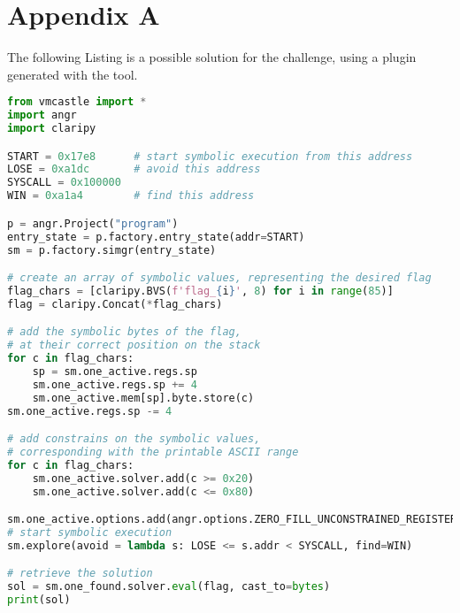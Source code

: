 \chapter*{Appendix A}

\label{anex}

The following Listing is a possible solution for the  challenge, using a plugin generated with the  tool.

\begin{lstlisting}[language=python]
from vmcastle import *
import angr
import claripy

START = 0x17e8      # start symbolic execution from this address
LOSE = 0xa1dc       # avoid this address
SYSCALL = 0x100000 
WIN = 0xa1a4        # find this address

p = angr.Project("program")
entry_state = p.factory.entry_state(addr=START)
sm = p.factory.simgr(entry_state)

# create an array of symbolic values, representing the desired flag
flag_chars = [claripy.BVS(f'flag_{i}', 8) for i in range(85)]
flag = claripy.Concat(*flag_chars)

# add the symbolic bytes of the flag, 
# at their correct position on the stack
for c in flag_chars:
    sp = sm.one_active.regs.sp
    sm.one_active.regs.sp += 4
    sm.one_active.mem[sp].byte.store(c)
sm.one_active.regs.sp -= 4

# add constrains on the symbolic values,
# corresponding with the printable ASCII range
for c in flag_chars:
    sm.one_active.solver.add(c >= 0x20)
    sm.one_active.solver.add(c <= 0x80)

sm.one_active.options.add(angr.options.ZERO_FILL_UNCONSTRAINED_REGISTERS)
# start symbolic execution
sm.explore(avoid = lambda s: LOSE <= s.addr < SYSCALL, find=WIN)

# retrieve the solution
sol = sm.one_found.solver.eval(flag, cast_to=bytes)
print(sol)
\end{lstlisting}
